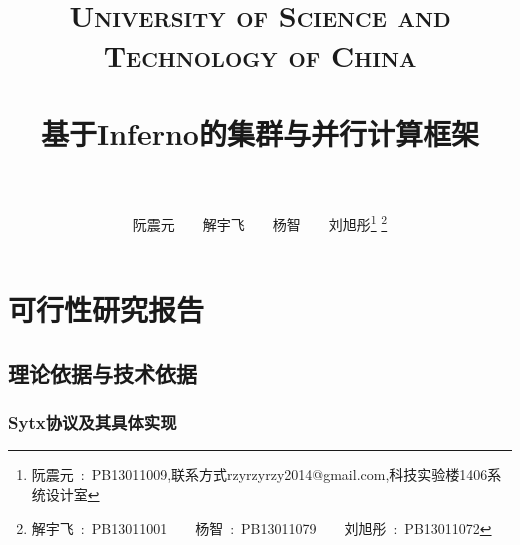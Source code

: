 \documentclass[paper=a4]{ctexart} %
\title{
  \normalfont \normalsize 
  \textsc{\\~\\~\\~\\~\\~\\University of Science and Technology of China} \\ [25pt] %
  \horrule{0.5pt} \\[0.4cm] %
  \huge 基于Inferno的集群与并行计算框架 \\ %
  \horrule{2pt} \\[0.5cm] %
}
\author{\Large{阮震元~~~~解宇飞~~~~杨智~~~~刘旭彤}\footnote{阮震元~:~PB13011009,联系方式rzyrzyrzy2014@gmail.com,科技实验楼1406系统设计室}
\setcounter{footnote}{-1}
\footnote{解宇飞~:~PB13011001~~~~杨智~:~PB13011079~~~~刘旭彤~:~PB13011072}
} %
\date{} %
\numberwithin{equation}{section} %
\numberwithin{figure}{section} %
\numberwithin{table}{section} %
\begin{document}
\maketitle %
 
\clearpage
\setcounter{section}{0}
\setcounter{subsection}{0}
\setcounter{subsubsection}{0}
\tableofcontents
\clearpage

\section{可行性研究报告}

\subsection{理论依据与技术依据}

\subsubsection{Sytx协议及其具体实现}
\end{document}
